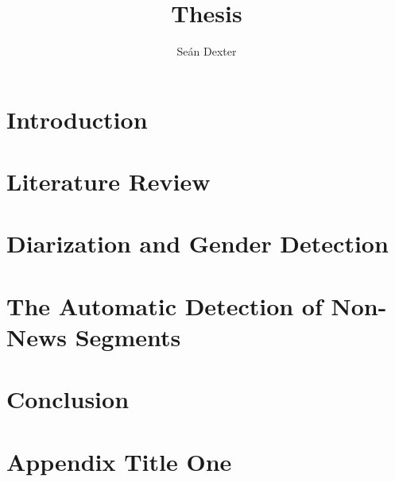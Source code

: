 \documentclass[a4paper]{report}
\title{Thesis}
\author{Se\'{a}n Dexter}
\begin{document}




\doublespacing
\tableofcontents

\singlespacing
\chapter{Introduction}


\singlespacing
\chapter{Literature Review}


\singlespacing
\chapter{Diarization and Gender Detection}


\singlespacing
\chapter{The Automatic Detection of Non-News Segments}


\singlespacing
\chapter{Conclusion}


\singlespacing
\appendix
\chapter{Appendix Title One}

\doublespacing
\printbibliography
\end{document}
